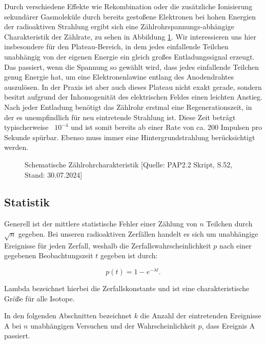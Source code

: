 \documentclass{article}
\begin{document}
Durch verschiedene Effekte wie Rekombination oder die zusätzliche Ionisierung sekundärer Gasmoleküle durch bereits gestoßene Elektronen bei hohen Energien der radioaktiven Strahlung ergibt sich eine Zählrohrspannungs-abhängige Charakteristik der Zählrate, zu sehen in Abbildung \ref{fig:zählrohrcharakteristik}. Wir interessieren uns hier insbesondere für den Plateau-Bereich, in dem jedes einfallende Teilchen unabhängig von der eigenen Energie ein gleich großes Entladungssignal erzeugt. Das passiert, wenn die Spannung so gewählt wird, dass jedes einfallende Teilchen genug Energie hat, um eine Elektronenlawine entlang des Anodendrahtes auszulösen. In der Praxis ist aber auch dieses Plateau nicht exakt gerade, sondern besitzt aufgrund der Inhomogenität des elektrischen Feldes einen leichten Anstieg. Nach jeder Entladung benötigt das Zählrohr erstmal eine Regenerationszeit, in der es unempfindlich für neu eintretende Strahlung ist. Diese Zeit beträgt typischerweise ~$10^{-4}$ und ist somit bereits ab einer Rate von ca. 200 Impulsen pro Sekunde spürbar. Ebenso muss immer eine  Hintergrundstrahlung berücksichtigt werden. 

\begin{figure}[!b]
    \centering
    \caption{Schematische Zählrohrcharakteristik [Quelle: PAP2.2 Skript, S.52, Stand: 30.07.2024]}
    \label{fig:zählrohrcharakteristik}
\end{figure}

\newpage
\subsection{Statistik}

Generell ist der mittlere statistische Fehler einer Zählung von $n$ Teilchen durch $\sqrt{n}$ gegeben. Bei unseren radioaktiven Zerfällen handelt es sich um unabhängige Ereignisse für jeden Zerfall, weshalb die Zerfallswahrscheinlichkeit $p$ nach einer gegebenen Beobachtungszeit $t$ gegeben ist durch:

\begin{equation}
    p(t) = 1 - e^{- \lambda t}.
\end{equation}

Lambda bezeichnet hierbei die Zerfallskonstante und ist eine charakteristische Größe für alle Isotope. 

In den folgenden Abschnitten bezeichnet $k$ die Anzahl der eintretenden Ereignisse A bei $n$ unabhängigen Versuchen und der Wahrscheinlichkeit $p$, dass Ereignis A passiert.  
\end{document}
